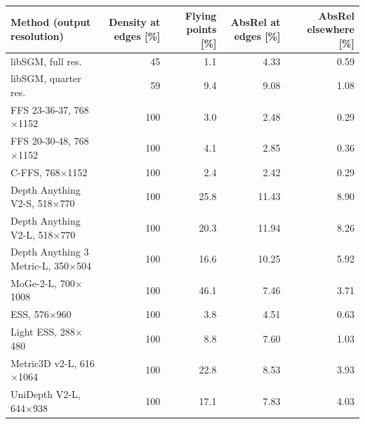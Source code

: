\begin{tabular}{@{}lrrrr@{}}
\toprule
Method (output resolution) & Density at edges [\%] & Flying points [\%] & AbsRel at edges [\%] & AbsRel elsewhere [\%] \\
\midrule
libSGM, full res. & 45 & 1.1 & 4.33 & 0.59 \\
libSGM, quarter res. & 59 & 9.4 & 9.08 & 1.08 \\
FFS 23-36-37, 768$\times$1152 & 100 & 3.0 & 2.48 & 0.29 \\
FFS 20-30-48, 768$\times$1152 & 100 & 4.1 & 2.85 & 0.36 \\
C-FFS, 768$\times$1152 & 100 & 2.4 & 2.42 & 0.29 \\
Depth Anything V2-S, 518$\times$770 & 100 & 25.8 & 11.43 & 8.90 \\
Depth Anything V2-L, 518$\times$770 & 100 & 20.3 & 11.94 & 8.26 \\
Depth Anything 3 Metric-L, 350$\times$504 & 100 & 16.6 & 10.25 & 5.92 \\
MoGe-2-L, 700$\times$1008 & 100 & 46.1 & 7.46 & 3.71 \\
ESS, 576$\times$960 & 100 & 3.8 & 4.51 & 0.63 \\
Light ESS, 288$\times$480 & 100 & 8.8 & 7.60 & 1.03 \\
Metric3D v2-L, 616$\times$1064 & 100 & 22.8 & 8.53 & 3.93 \\
UniDepth V2-L, 644$\times$938 & 100 & 17.1 & 7.83 & 4.03 \\
\bottomrule
\end{tabular}
